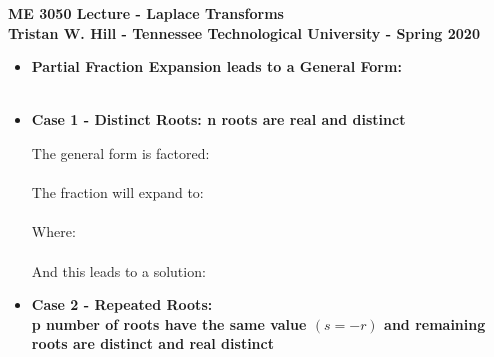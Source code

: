 \documentclass[11pt]{article}
\begin{document}
\textbf{ \LARGE ME 3050 Lecture - Laplace Transforms} \vspace{3mm}\\
\textbf{ \hspace*{5mm}Tristan W. Hill - Tennessee Technological University - Spring 2020 } \vspace{3mm}\\

\Large
\begin{itemize}

\item \textbf{ \LARGE Partial Fraction Expansion leads to a General Form: } \\

 \vspace{5mm}\\

\item \textbf{ \LARGE Case 1 - Distinct Roots: n roots are real and distinct} \vspace{5mm}\\
\Large

	The general form is factored:\\
	
	 \vspace{5mm}\\

	The fraction will expand to: \\

	 \vspace{5mm}\\

	Where:\\

	 \vspace{5mm}\\

	And this leads to a solution: \\


\newpage
\item \textbf{ \LARGE Case 2 - Repeated Roots: \\ p number of roots have the same value $(s =-r)$ and remaining roots are distinct and real distinct} \vspace{5mm}\\
\Large
	

\end{itemize}
\end{document}

